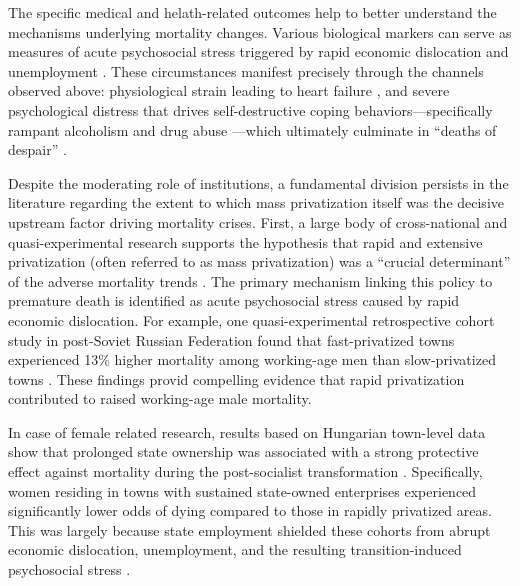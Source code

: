 \documentclass[12pt]{article}
\begin{document}
The specific medical and helath-related outcomes help to better understand the mechanisms underlying mortality changes. Various biological markers can serve as measures of acute psychosocial 
stress triggered by rapid economic dislocation and unemployment \citep{Stuckler2009}. These circumstances manifest precisely through the channels observed above: physiological 
strain leading to heart failure \citep{B_Brainerd1998, Leon1998}, and severe psychological distress that drives self-destructive coping behaviors---specifically rampant 
alcoholism and drug abuse \citep{Zaridze2009}---which ultimately culminate in ``deaths of despair'' \citep{King2009}.

Despite the moderating role of institutions, a fundamental division persists in the literature regarding the extent to which mass 
privatization itself was the decisive upstream factor driving mortality crises.
First, a large body of cross-national and quasi-experimental research supports the hypothesis that rapid and extensive privatization (often referred to as mass privatization) was a 
``crucial determinant'' of the adverse mortality trends \citep{Stuckler2009, Azarova2018, Azarova2019, King2009}. The primary mechanism linking this policy to premature death is identified 
as acute psychosocial stress caused by rapid economic dislocation. For example, one quasi-experimental retrospective cohort study in post-Soviet Russian Federation found that fast-privatized 
towns experienced 13\% higher mortality among working-age men than slow-privatized towns \citep{Azarova2018}. These findings provid compelling evidence that rapid privatization contributed 
to raised working-age male mortality. 

In case of female related research, results based on Hungarian town-level data show that prolonged state ownership was associated with a strong 
protective effect against mortality during the post-socialist transformation \citep{Scheiring2018}. Specifically, women residing in towns with sustained state-owned enterprises 
experienced significantly lower odds of dying compared to those in rapidly privatized areas. This was largely because state employment shielded these cohorts from abrupt economic 
dislocation, unemployment, and the resulting transition-induced psychosocial stress \citep{Scheiring2018}. 
\end{document}
